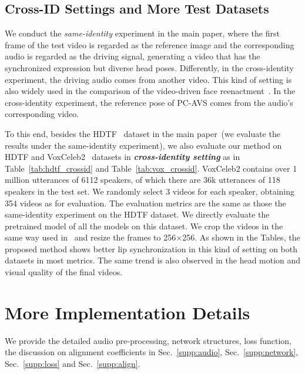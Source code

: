 \subsection{Cross-ID Settings and More Test Datasets}
\label{sec:datasets}
We conduct the \textit{same-identity} experiment in the main paper, where the first frame of the test video is regarded as the reference image and the corresponding audio is regarded as the driving signal, generating a video that has the synchronized expression but diverse head poses. Differently, in the cross-identity experiment, the driving audio comes from another video. This kind of setting is also widely used in the comparison of the video-driven face reenactment~\cite{fomm}. In the cross-identity experiment, the reference pose of PC-AVS comes from the audio's corresponding video.

To this end, besides the HDTF~\cite{hdtf} dataset in the main paper~(we evaluate the results under the same-identity experiment), we also evaluate our method on HDTF and VoxCeleb2~\cite{voxceleb} datasets in \textbf{\textit{cross-identity setting}} as in Table~\ref{tab:hdtf_crossid} and Table~\ref{tab:vox_crossid}. VoxCeleb2 contains over 1 million utterances of 6112 speakers, of which there are 36k utterances of 118 speakers in the test set. We randomly select 3 videos for each speaker, obtaining 354 videos as for evaluation. The evaluation metrics are the same as those the same-identity experiment on the HDTF dataset. We directly evaluate the pretrained model of all the models on this dataset. We crop the videos in the same way used in~\cite{fomm} and resize the frames to 256$\times$256. As shown in the Tables, the proposed method shows 
 better lip synchronization in this kind of setting on both datasets in most metrics. The same trend is also observed in the head motion and visual quality of the final videos.








\section{More Implementation Details}
We provide the detailed audio pre-processing, network structures, loss function, the discussion on alignment coefficients in Sec.~\ref{supp:audio}, Sec.~\ref{supp:network}, Sec.~\ref{supp:loss} and Sec.~\ref{supp:align}. 


